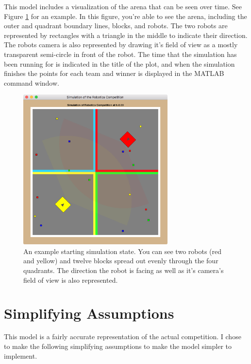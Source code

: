 \documentclass[12pt]{article}
\begin{document}
This model includes a visualization of the arena that can be seen over time. See Figure \ref{fig:arena-1} for an example. In this figure, you're able to see the arena, including the outer and quadrant boundary lines, blocks, and robots. The two robots are represented by rectangles with a triangle in the middle to indicate their direction. The robots camera is also represented by drawing it's field of view as a mostly transparent semi-circle in front of the robot. The time that the simulation has been running for is indicated in the title of the plot, and when the simulation finishes the points for each team and winner is displayed in the MATLAB command window.

\begin{figure}[hbt]
  \center
  \includegraphics[width=0.7\textwidth]{images/arena-1.png}
  \caption{An example starting simulation state. You can see two robots (red and yellow) and twelve blocks spread out evenly through the four quadrants. The direction the robot is facing as well as it's camera's field of view is also represented.}
  \label{fig:arena-1}
\end{figure}

\section{Simplifying Assumptions}
This model is a fairly accurate representation of the actual competition. I chose to make the following simplifying assumptions to make the model simpler to implement.
\end{document}

